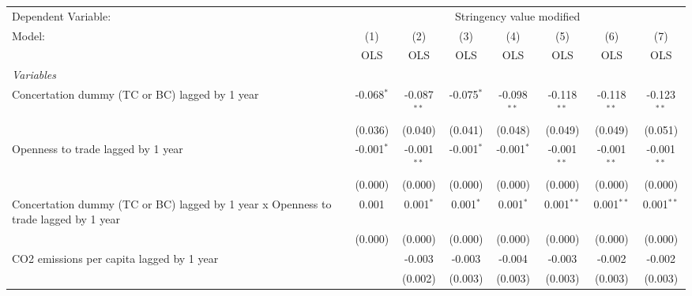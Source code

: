 
\begingroup
\centering
\begin{tabular}{lccccccc}
   \toprule
   Dependent Variable: & \multicolumn{7}{c}{Stringency value modified}\\
   Model:                                                                              & (1)          & (2)           & (3)          & (4)           & (5)           & (6)           & (7)\\  
                                                                                       &  OLS         & OLS           & OLS          & OLS           & OLS           & OLS           & OLS\\  
   \midrule
   \emph{Variables}\\
   Concertation dummy (TC or BC) lagged by 1 year                                      & -0.068$^{*}$ & -0.087$^{**}$ & -0.075$^{*}$ & -0.098$^{**}$ & -0.118$^{**}$ & -0.118$^{**}$ & -0.123$^{**}$\\   
                                                                                       & (0.036)      & (0.040)       & (0.041)      & (0.048)       & (0.049)       & (0.049)       & (0.051)\\   
   Openness to trade lagged by 1 year                                                  & -0.001$^{*}$ & -0.001$^{**}$ & -0.001$^{*}$ & -0.001$^{*}$  & -0.001$^{**}$ & -0.001$^{**}$ & -0.001$^{**}$\\   
                                                                                       & (0.000)      & (0.000)       & (0.000)      & (0.000)       & (0.000)       & (0.000)       & (0.000)\\   
   Concertation dummy (TC or BC) lagged by 1 year x Openness to trade lagged by 1 year & 0.001        & 0.001$^{*}$   & 0.001$^{*}$  & 0.001$^{*}$   & 0.001$^{**}$  & 0.001$^{**}$  & 0.001$^{**}$\\   
                                                                                       & (0.000)      & (0.000)       & (0.000)      & (0.000)       & (0.000)       & (0.000)       & (0.000)\\   
   CO2 emissions per capita lagged by 1 year                                           &              & -0.003        & -0.003       & -0.004        & -0.003        & -0.002        & -0.002\\   
                                                                                       &              & (0.002)       & (0.003)      & (0.003)       & (0.003)       & (0.003)       & (0.003)\\   

\end{tabular}
